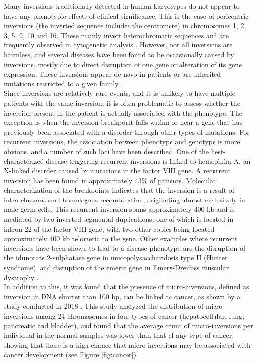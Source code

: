 Many inversions traditionally detected in human karyotypes do not appear to have any phenotypic effects of clinical significance. This is the case of pericentric inversions (the inverted sequence includes the centromere) in chromosomes 1, 2, 3, 5, 9, 10 and 16. These mainly invert heterochromatic sequences and are frequently observed in cytogenetic analysis \cite{puig_human_2015}. However, not all inversions are harmless, and several diseases have been found to be occasionally caused by inversions, mostly due to direct disruption of one gene or alteration of its gene expression. These inversions appear de novo in patients or are inherited mutations restricted to a given family. \\
Since inversions are relatively rare events, and it is unlikely to have multiple patients with the same inversion, it is often problematic to assess whether the inversion present in the patient is actually associated with the phenotype. The exception is when the inversion breakpoint falls within or near a gene that has previously been associated with a disorder through other types of mutations. For recurrent inversions, the association between phenotype and genotype is more obvious, and a number of such loci have been described. One of the best-characterized disease-triggering recurrent inversions is linked to hemophilia A, an X-linked disorder caused by mutations in the factor VIII gene. A recurrent inversion has been found in approximately 43\% of patients.
Molecular characterization of the breakpoints indicates that the inversion is a result of intra-chromosomal homologous recombination, originating almost exclusively in male germ cells. This recurrent inversion spans approximately 400 kb and is mediated by two inverted segmental duplications, one of which is located in intron 22 of the factor VIII gene, with two other copies being located approximately 400 kb telomeric to the gene. Other examples where recurrent inversions have been shown to lead to a disease phenotype are the disruption of the idunorate 2-sulphatase gene in mucopolysaccharidosis type II (Hunter syndrome), and disruption of the emerin gene in Emery-Dreifuss muscular dystrophy \cite{feuk_inversion_2010}. \\
In addition to this, it was found that the presence of micro-inversions, defined as inversion in DNA shorter than 100 bp, can be linked to cancer, as shown by a study conducted in 2018 \cite{qu_micro-inversions_2018}. This study analyzed the distribution of micro-inversions among 24 chromosomes in four types of cancer (hepatocellular, lung, pancreatic and bladder), and found that the average count of micro-inversions per individual in the normal samples was lower than that of any type of cancer, showing that there is a high chance that micro-inversions may be associated with cancer development (see Figure \ref{fig:cancer}).

